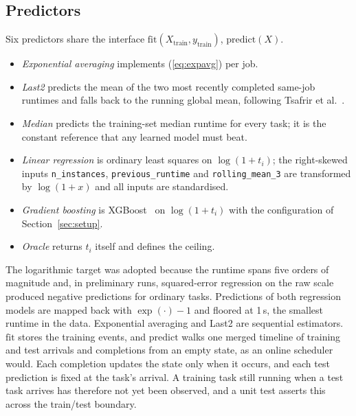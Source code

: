 \documentclass[conference]{IEEEtran}
\begin{document}
\subsection{Predictors}
Six predictors share the interface $\mathrm{fit}(X_{\mathrm{train}},
y_{\mathrm{train}})$, $\mathrm{predict}(X)$.
\begin{itemize}
  \item \emph{Exponential averaging} implements (\ref{eq:expavg}) per job.
  \item \emph{Last2} predicts the mean of the two most recently completed
    same-job runtimes and falls back to the running global mean, following
    Tsafrir et al.~\cite{tsafrir_backfilling_2007}.
  \item \emph{Median} predicts the training-set median runtime for every
    task; it is the constant reference that any learned model must beat.
  \item \emph{Linear regression} is ordinary least squares on
    $\log(1 + t_i)$; the right-skewed inputs \texttt{n\_instances},
    \texttt{previous\_runtime} and \texttt{rolling\_mean\_3} are transformed
    by $\log(1 + x)$ and all inputs are standardised.
  \item \emph{Gradient boosting} is XGBoost~\cite{chen_xgboost_2016} on
    $\log(1 + t_i)$ with the configuration of Section~\ref{sec:setup}.
  \item \emph{Oracle} returns $t_i$ itself and defines the ceiling.
\end{itemize}
The logarithmic target was adopted because the runtime spans five orders of
magnitude and, in preliminary runs, squared-error regression on the raw
scale produced negative predictions for ordinary tasks. Predictions of
both regression models are mapped back with $\exp(\cdot) - 1$ and floored at
1\,s, the smallest runtime in the data. Exponential averaging and Last2 are
sequential estimators. $\mathrm{fit}$ stores the training events, and
$\mathrm{predict}$ walks one merged timeline of training and test arrivals
and completions from an empty state, as an online scheduler would. Each
completion updates the state only when it occurs, and each test prediction
is fixed at the task's arrival. A training task still running when a test
task arrives has therefore not yet been observed, and a unit test asserts
this across the train/test boundary.
\end{document}
